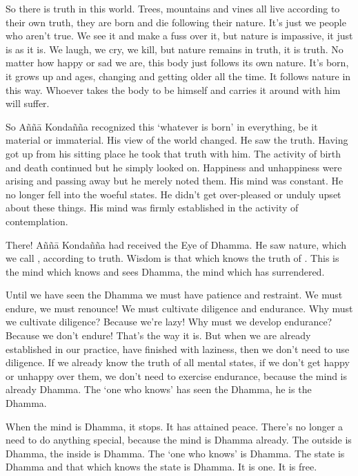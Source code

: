 So there is truth in this world. Trees, mountains and vines all live according to their own truth, they are born and die following their nature. It's just we people who aren't true. We see it and make a fuss over it, but nature is impassive, it just is as it is. We laugh, we cry, we kill, but nature remains in truth, it is truth. No matter how happy or sad we are, this body just follows its own nature. It's born, it grows up and ages, changing and getting older all the time. It follows nature in this way. Whoever takes the body to be himself and carries it around with him will suffer. 

So A\~n\~n\=a Konda\~n\~na recognized this `whatever is born' in everything, be it material or immaterial. His view of the world changed. He saw the truth. Having got up from his sitting place he took that truth with him. The activity of birth and death continued but he simply looked on. Happiness and unhappiness were arising and passing away but he merely noted them. His mind was constant. He no longer fell into the woeful states. He didn't get over-pleased or unduly upset about these things. His mind was firmly established in the activity of contemplation.

There! A\~n\~n\=a Konda\~n\~na had received the Eye of Dhamma. He saw nature, which we call , according to truth. Wisdom is that which knows the truth of . This is the mind which knows and sees Dhamma, the mind which has surrendered. 

Until we have seen the Dhamma we must have patience and restraint. We must endure, we must renounce! We must cultivate diligence and endurance. Why must we cultivate diligence? Because we're lazy! Why must we develop endurance? Because we don't endure! That's the way it is. But when we are already established in our practice, have finished with laziness, then we don't need to use diligence. If we already know the truth of all mental states, if we don't get happy or unhappy over them, we don't need to exercise endurance, because the mind is already Dhamma. The `one who knows' has seen the Dhamma, he is the Dhamma. 

When the mind is Dhamma, it stops. It has attained peace. There's no longer a need to do anything special, because the mind is Dhamma already. The outside is Dhamma, the inside is Dhamma. The `one who knows' is Dhamma. The state is Dhamma and that which knows the state is Dhamma. It is one. It is free. 

